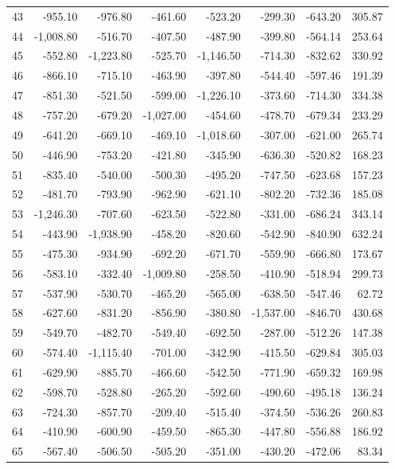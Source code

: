 \begin{longtable}{rrrrrrrr}
43 & -955.10 & -976.80 & -461.60 & -523.20 & -299.30 & -643.20 & 305.87  \\
44 & -1,008.80 & -516.70 & -407.50 & -487.90 & -399.80 & -564.14 & 253.64  \\
45 & -552.80 & -1,223.80 & -525.70 & -1,146.50 & -714.30 & -832.62 & 330.92  \\
46 & -866.10 & -715.10 & -463.90 & -397.80 & -544.40 & -597.46 & 191.39  \\
47 & -851.30 & -521.50 & -599.00 & -1,226.10 & -373.60 & -714.30 & 334.38  \\
48 & -757.20 & -679.20 & -1,027.00 & -454.60 & -478.70 & -679.34 & 233.29  \\
49 & -641.20 & -669.10 & -469.10 & -1,018.60 & -307.00 & -621.00 & 265.74  \\
50 & -446.90 & -753.20 & -421.80 & -345.90 & -636.30 & -520.82 & 168.23  \\
51 & -835.40 & -540.00 & -500.30 & -495.20 & -747.50 & -623.68 & 157.23  \\
52 & -481.70 & -793.90 & -962.90 & -621.10 & -802.20 & -732.36 & 185.08  \\
53 & -1,246.30 & -707.60 & -623.50 & -522.80 & -331.00 & -686.24 & 343.14  \\
54 & -443.90 & -1,938.90 & -458.20 & -820.60 & -542.90 & -840.90 & 632.24  \\
55 & -475.30 & -934.90 & -692.20 & -671.70 & -559.90 & -666.80 & 173.67  \\
56 & -583.10 & -332.40 & -1,009.80 & -258.50 & -410.90 & -518.94 & 299.73  \\
57 & -537.90 & -530.70 & -465.20 & -565.00 & -638.50 & -547.46 & 62.72  \\
58 & -627.60 & -831.20 & -856.90 & -380.80 & -1,537.00 & -846.70 & 430.68  \\
59 & -549.70 & -482.70 & -549.40 & -692.50 & -287.00 & -512.26 & 147.38  \\
60 & -574.40 & -1,115.40 & -701.00 & -342.90 & -415.50 & -629.84 & 305.03  \\
61 & -629.90 & -885.70 & -466.60 & -542.50 & -771.90 & -659.32 & 169.98  \\
62 & -598.70 & -528.80 & -265.20 & -592.60 & -490.60 & -495.18 & 136.24  \\
63 & -724.30 & -857.70 & -209.40 & -515.40 & -374.50 & -536.26 & 260.83  \\
64 & -410.90 & -600.90 & -459.50 & -865.30 & -447.80 & -556.88 & 186.92  \\
65 & -567.40 & -506.50 & -505.20 & -351.00 & -430.20 & -472.06 & 83.34  \\

\end{longtable}
